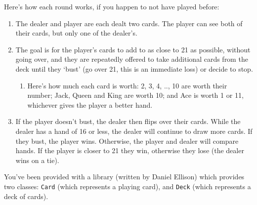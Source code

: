 \documentclass{hitec}
\begin{document}
Here's how each round works, if you happen to not have played before:
\begin{enumerate}
	\item The dealer and player are each dealt two cards. The player can see both of their cards, but only one of the dealer's.
	\item The goal is for the player's cards to add to as close to 21 as possible, without going over, and they are repeatedly offered to take additional cards from the deck until they `bust' (go over 21, this is an immediate loss) or decide to stop.
		\begin{enumerate}
		\item Here's how much each card is worth: 2, 3, 4, .., 10 are worth their number; Jack, Queen and King are worth 10; and Ace is worth 1 or 11, whichever gives the player a better hand.
		\end{enumerate}
	\item If the player doesn't bust, the dealer then flips over their cards. While the dealer has a hand of 16 or less, the dealer will continue to draw more cards. If they bust, the player wins. Otherwise, the player and dealer will compare hands. If the player is closer to 21 they win, otherwise they lose (the dealer wins on a tie).
\end{enumerate}

\noindent You've been provided with a library (written by Daniel Ellison) which provides two classes: \texttt{Card} (which represents a playing card), and \texttt{Deck} (which represents a deck of cards).
\end{document}
